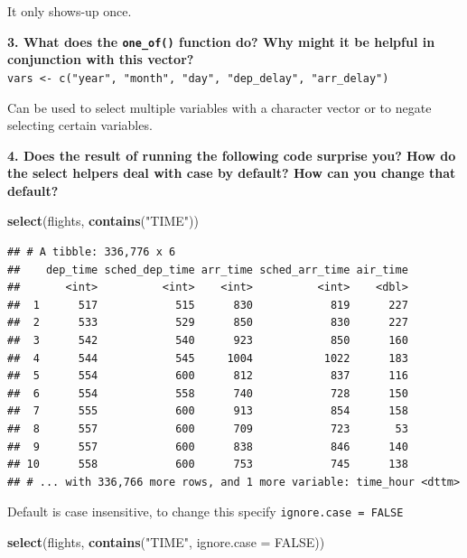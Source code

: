 \documentclass[]{book}
\newenvironment{Shaded}{\begin{snugshade}}{\end{snugshade}}
\newcommand{\DataTypeTok}[1]{\textcolor[rgb]{0.13,0.29,0.53}{#1}}
\newcommand{\KeywordTok}[1]{\textcolor[rgb]{0.13,0.29,0.53}{\textbf{#1}}}
\newcommand{\NormalTok}[1]{#1}
\newcommand{\OtherTok}[1]{\textcolor[rgb]{0.56,0.35,0.01}{#1}}
\newcommand{\StringTok}[1]{\textcolor[rgb]{0.31,0.60,0.02}{#1}}
\theoremstyle{definition}
\theoremstyle{definition}
\theoremstyle{definition}
\theoremstyle{remark}
\begin{document}
It only shows-up once.

\textbf{3. What does the \texttt{one\_of()} function do? Why might it be
helpful in conjunction with this vector?}\\
\texttt{vars\ \textless{}-\ c("year",\ "month",\ "day",\ "dep\_delay",\ "arr\_delay")}

Can be used to select multiple variables with a character vector or to
negate selecting certain variables.

\textbf{4. Does the result of running the following code surprise you?
How do the select helpers deal with case by default? How can you change
that default?}

\begin{Shaded}
\begin{Highlighting}[]
\KeywordTok{select}\NormalTok{(flights, }\KeywordTok{contains}\NormalTok{(}\StringTok{"TIME"}\NormalTok{))}
\end{Highlighting}
\end{Shaded}

\begin{verbatim}
## # A tibble: 336,776 x 6
##    dep_time sched_dep_time arr_time sched_arr_time air_time
##       <int>          <int>    <int>          <int>    <dbl>
##  1      517            515      830            819      227
##  2      533            529      850            830      227
##  3      542            540      923            850      160
##  4      544            545     1004           1022      183
##  5      554            600      812            837      116
##  6      554            558      740            728      150
##  7      555            600      913            854      158
##  8      557            600      709            723       53
##  9      557            600      838            846      140
## 10      558            600      753            745      138
## # ... with 336,766 more rows, and 1 more variable: time_hour <dttm>
\end{verbatim}

Default is case insensitive, to change this specify
\texttt{ignore.case\ =\ FALSE}

\begin{Shaded}
\begin{Highlighting}[]
\KeywordTok{select}\NormalTok{(flights, }\KeywordTok{contains}\NormalTok{(}\StringTok{"TIME"}\NormalTok{, }\DataTypeTok{ignore.case =} \OtherTok{FALSE}\NormalTok{))}
\end{Highlighting}
\end{Shaded}
\end{document}
